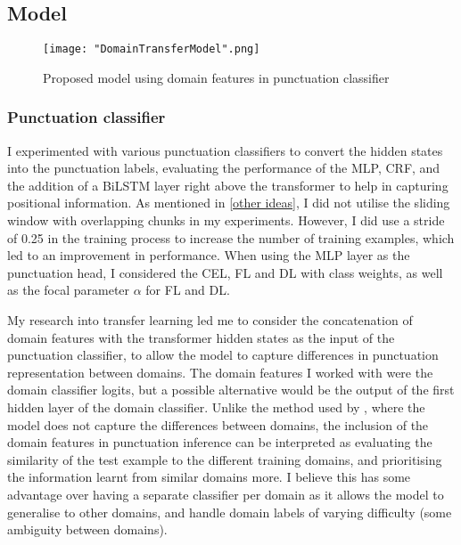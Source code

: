 \documentclass[a4paper]{article}
\begin{document}
\begin{multicols}{2}
\subsection{Model}
\begin{figure*}[htb]
  \centering
  \texttt{[image: "DomainTransferModel".png]}
  \caption{Proposed model using domain features in punctuation classifier}
\end{figure*}

\subsubsection{Punctuation classifier}
I experimented with various punctuation classifiers to convert the hidden states into the punctuation labels, evaluating the performance of the MLP, CRF, and the addition of a BiLSTM layer right above the transformer to help in capturing positional information. As mentioned in \ref{other ideas}, I did not utilise the sliding window with overlapping chunks in my experiments. However, I did use a stride of 0.25 in the training process to increase the number of training examples, which led to an improvement in performance. When using the MLP layer as the punctuation head, I considered the CEL, FL and DL with class weights, as well as the focal parameter $\alpha$ for FL and DL.

My research into transfer learning led me to consider the concatenation of domain features with the transformer hidden states as the input of the punctuation classifier, to allow the model to capture differences in punctuation representation between domains. The domain features I worked with were the domain classifier logits, but a possible alternative would be the output of the first hidden layer of the domain classifier. Unlike the method used by \cite{keung2019adversarial}, where the model does not capture the differences between domains, the inclusion of the domain features in punctuation inference can be interpreted as evaluating the similarity of the test example to the different training domains, and prioritising the information learnt from similar domains more. I believe this has some advantage over having a separate classifier per domain as it allows the model to generalise to other domains, and handle domain labels of varying difficulty (some ambiguity between domains).


\end{multicols}
\end{document}
